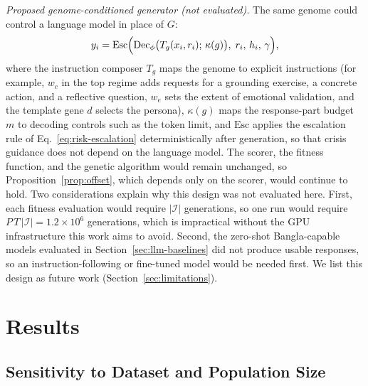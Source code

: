\documentclass[mathematics,article,submit,xetex,moreauthors]{Definitions/mdpi}
\begin{document}
\emph{Proposed genome-conditioned generator (not evaluated).} The same genome
could control a language model in place of $G$:
\begin{equation}
\label{eq:llm-proposed}
  y_i = \mathrm{Esc}\Bigl(\mathrm{Dec}_{\phi}\bigl(T_g(x_i, r_i);\,\kappa(g)\bigr),\; r_i,\, h_i,\, \gamma\Bigr),
\end{equation}
where the instruction composer $T_g$ maps the genome to explicit instructions
(for example, $w_c$ in the top regime adds requests for a grounding exercise, a
concrete action, and a reflective question, $w_e$ sets the extent of emotional
validation, and the template gene $d$ selects the persona), $\kappa(g)$ maps the
response-part budget $m$ to decoding controls such as the token limit, and
$\mathrm{Esc}$ applies the escalation rule of Eq.~\eqref{eq:risk-escalation}
deterministically after generation, so that crisis guidance does not depend on
the language model. The scorer, the fitness function, and the genetic algorithm
would remain unchanged, so Proposition~\ref{prop:offset}, which depends only on
the scorer, would continue to hold. Two considerations explain why this design
was not evaluated here. First, each fitness evaluation would require
$|\mathcal{I}|$ generations, so one run would require
$P\,T\,|\mathcal{I}| = 1.2\times10^{6}$ generations, which is impractical without
the GPU infrastructure this work aims to avoid. Second, the zero-shot
Bangla-capable models evaluated in Section~\ref{sec:llm-baselines} did not
produce usable responses, so an instruction-following or fine-tuned model would
be needed first. We list this design as future work
(Section~\ref{sec:limitations}).

\section{Results}
\label{sec:results}

\subsection{Sensitivity to Dataset and Population Size}
\label{sec:dataset-size}\label{sec:population-size}
\end{document}
